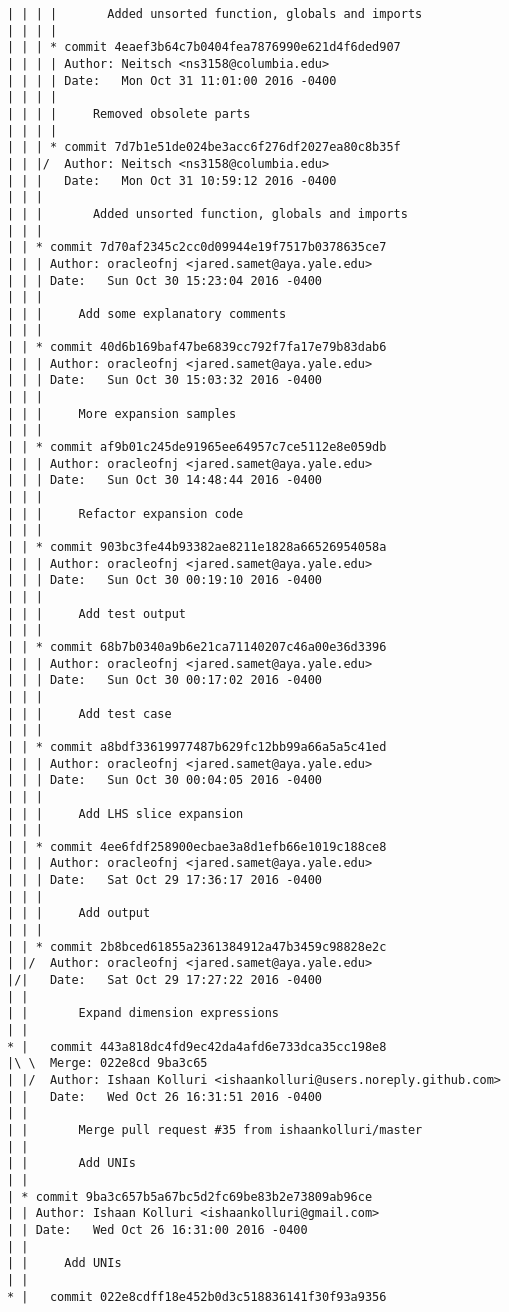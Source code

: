 \begin{lstlisting}
| | | |       Added unsorted function, globals and imports
| | | |     
| | | * commit 4eaef3b64c7b0404fea7876990e621d4f6ded907
| | | | Author: Neitsch <ns3158@columbia.edu>
| | | | Date:   Mon Oct 31 11:01:00 2016 -0400
| | | | 
| | | |     Removed obsolete parts
| | | |     
| | | * commit 7d7b1e51de024be3acc6f276df2027ea80c8b35f
| | |/  Author: Neitsch <ns3158@columbia.edu>
| | |   Date:   Mon Oct 31 10:59:12 2016 -0400
| | |   
| | |       Added unsorted function, globals and imports
| | |    
| | * commit 7d70af2345c2cc0d09944e19f7517b0378635ce7
| | | Author: oracleofnj <jared.samet@aya.yale.edu>
| | | Date:   Sun Oct 30 15:23:04 2016 -0400
| | | 
| | |     Add some explanatory comments
| | |    
| | * commit 40d6b169baf47be6839cc792f7fa17e79b83dab6
| | | Author: oracleofnj <jared.samet@aya.yale.edu>
| | | Date:   Sun Oct 30 15:03:32 2016 -0400
| | | 
| | |     More expansion samples
| | |    
| | * commit af9b01c245de91965ee64957c7ce5112e8e059db
| | | Author: oracleofnj <jared.samet@aya.yale.edu>
| | | Date:   Sun Oct 30 14:48:44 2016 -0400
| | | 
| | |     Refactor expansion code
| | |    
| | * commit 903bc3fe44b93382ae8211e1828a66526954058a
| | | Author: oracleofnj <jared.samet@aya.yale.edu>
| | | Date:   Sun Oct 30 00:19:10 2016 -0400
| | | 
| | |     Add test output
| | |    
| | * commit 68b7b0340a9b6e21ca71140207c46a00e36d3396
| | | Author: oracleofnj <jared.samet@aya.yale.edu>
| | | Date:   Sun Oct 30 00:17:02 2016 -0400
| | | 
| | |     Add test case
| | |    
| | * commit a8bdf33619977487b629fc12bb99a66a5a5c41ed
| | | Author: oracleofnj <jared.samet@aya.yale.edu>
| | | Date:   Sun Oct 30 00:04:05 2016 -0400
| | | 
| | |     Add LHS slice expansion
| | |    
| | * commit 4ee6fdf258900ecbae3a8d1efb66e1019c188ce8
| | | Author: oracleofnj <jared.samet@aya.yale.edu>
| | | Date:   Sat Oct 29 17:36:17 2016 -0400
| | | 
| | |     Add output
| | |    
| | * commit 2b8bced61855a2361384912a47b3459c98828e2c
| |/  Author: oracleofnj <jared.samet@aya.yale.edu>
|/|   Date:   Sat Oct 29 17:27:22 2016 -0400
| |   
| |       Expand dimension expressions
| |     
* |   commit 443a818dc4fd9ec42da4afd6e733dca35cc198e8
|\ \  Merge: 022e8cd 9ba3c65
| |/  Author: Ishaan Kolluri <ishaankolluri@users.noreply.github.com>
| |   Date:   Wed Oct 26 16:31:51 2016 -0400
| |   
| |       Merge pull request #35 from ishaankolluri/master
| |       
| |       Add UNIs
| |   
| * commit 9ba3c657b5a67bc5d2fc69be83b2e73809ab96ce
| | Author: Ishaan Kolluri <ishaankolluri@gmail.com>
| | Date:   Wed Oct 26 16:31:00 2016 -0400
| | 
| |     Add UNIs
| |     
* |   commit 022e8cdff18e452b0d3c518836141f30f93a9356

\end{lstlisting}
